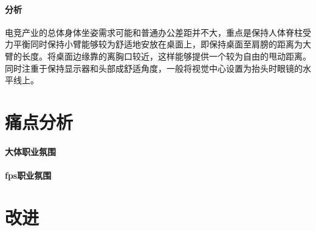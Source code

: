 \documentclass[UTF8]{ctexart}
\begin{document}
    \paragraph{分析}
    电竞产业的总体身体坐姿需求可能和普通办公差距并不大，重点是保持人体脊柱受力平衡同时保持小臂能够较为舒适地安放在桌面上，即保持桌面至肩膀的距离为大臂的长度。将桌面边缘靠的离胸口较近，这样能够提供一个较为自由的甩动距离。同时注重于保持显示器和头部成舒适角度，一般将视觉中心设置为抬头时眼镜的水平线上。


\section{痛点分析}
\paragraph{大体职业氛围}
\paragraph{fps职业氛围}

\section{改进}

\newpage

    
\end{document}
